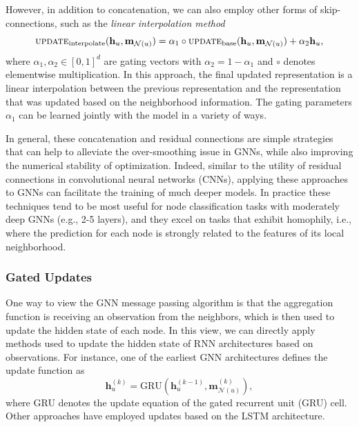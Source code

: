 \documentclass[10pt]{book}
\let\defaultmarginpar\marginpar
\renewcommand\marginpar[2][]{\defaultmarginpar{\itshape\color{gray}#2}}
\begin{document}
However, in addition to concatenation, we can also employ other forms of skip-connections, such as the \emph{linear interpolation method}\marginpar{linear interpolation method}
\begin{equation}
    \textsc{update}_\text{interpolate} ( \mathbf h_u, \mathbf m_{\mathcal N(u)}) = \alpha_1 \circ \textsc{update}_\text{base} (\mathbf h_u, \mathbf m_{\mathcal N(u)}) + \alpha_2 \mathbf h_u,
\end{equation}
where $\alpha_1, \alpha_2 \in [0, 1]^d$ are gating vectors with $\alpha_2 = 1 - \alpha_1$ and $\circ$ denotes elementwise multiplication. In this approach, the final updated representation is a linear interpolation between the previous representation and the representation that was updated based on the neighborhood information. The gating parameters $\alpha_1$ can be learned jointly with the model in a variety of ways.

In general, these concatenation and residual connections are simple strategies that can help to alleviate the over-smoothing issue in GNNs, while also improving the numerical stability of optimization. Indeed, similar to the utility of residual connections in convolutional neural networks (CNNs), applying these approaches to GNNs can facilitate the training of much deeper models. In practice these techniques tend to be most useful for node classification tasks with moderately deep GNNs (e.g., 2-5 layers), and they excel on tasks that exhibit homophily, i.e., where the prediction for each node is strongly related to the features of its local neighborhood.

\subsubsection{Gated Updates}

One way to view the GNN message passing algorithm is that the aggregation function is receiving an observation from the neighbors, which is then used to update the hidden state of each node. In this view, we can directly apply methods used to update the hidden state of RNN architectures based on observations. For instance, one of the earliest GNN architectures defines the update function as
\begin{equation}
    \mathbf h^{(k)}_u = \text{GRU}(\mathbf h_u^{(k-1)}, \mathbf m^{(k)}_{\mathcal N(u)}),
\end{equation}
where GRU denotes the update equation of the gated recurrent unit (GRU) cell. Other approaches have employed updates based on the
LSTM architecture.
\end{document}
